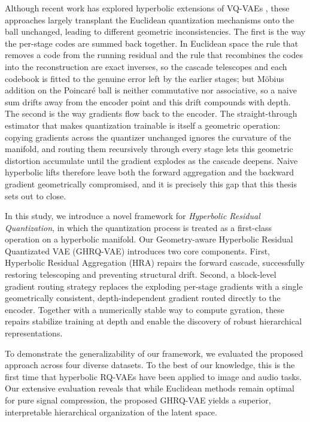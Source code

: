\documentclass[12pt]{report}
\begin{document}
Although recent work has explored hyperbolic extensions of VQ-VAEs \cite{hrqvae,hyprqvae_recsys,hypervq}, these approaches largely transplant the Euclidean quantization mechanisms onto the ball unchanged, leading to different geometric inconsistencies. The first is the way the per-stage codes are summed back together. In Euclidean space the rule that removes a code from the running residual and the rule that recombines the codes into the reconstruction are exact inverses, so the cascade telescopes and each codebook is fitted to the genuine error left by the earlier stages; but M\"obius addition on the Poincar\'e ball is neither commutative nor associative, so a naive sum drifts away from the encoder point and this drift compounds with depth. The second is the way gradients flow back to the encoder. The straight-through estimator that makes quantization trainable is itself a geometric operation: copying gradients across the quantizer unchanged ignores the curvature of the manifold, and routing them recursively through every stage lets this geometric distortion accumulate until the gradient explodes as the cascade deepens. Naive hyperbolic lifts therefore leave both the forward aggregation and the backward gradient geometrically compromised, and it is precisely this gap that this thesis sets out to close.


In this study, we introduce a novel framework for \emph{Hyperbolic Residual Quantization}, in which the quantization process is treated as a first-class operation on a hyperbolic manifold. Our Geometry-aware Hyperbolic Residual Quantizated VAE (GHRQ-VAE) introduces two core components. First, Hyperbolic Residual Aggregation (HRA) repairs the forward cascade, successfully restoring telescoping and preventing structural drift. Second, a block-level gradient routing strategy replaces the exploding per-stage gradients with a single geometrically consistent, depth-independent gradient routed directly to the encoder. Together with a numerically stable way to compute gyration, these repairs stabilize training at depth and enable the discovery of robust hierarchical representations.

To demonstrate the generalizability of our framework, we evaluated the proposed approach across four diverse datasets. To the best of our knowledge, this is the first time that hyperbolic RQ-VAEs have been applied to image and audio tasks. Our extensive evaluation reveals that while Euclidean methods remain optimal for pure signal compression, the proposed GHRQ-VAE yields a superior, interpretable hierarchical organization of the latent space.
\end{document}
